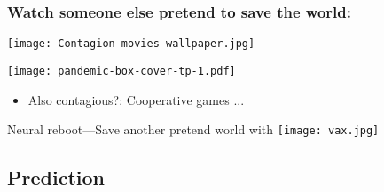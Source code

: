 \begin{frame}

  \frametitle{Watch someone else pretend to save the world:}

  \texttt{[image: Contagion-movies-wallpaper.jpg]}


\end{frame}

\begin{frame}

  \begin{block}{}
    \begin{center}
      \texttt{[image: pandemic-box-cover-tp-1.pdf]}
    \end{center}
    \begin{itemize}
    \item 
      Also contagious?: Cooperative games ...
    \end{itemize}
    
  \end{block}

\end{frame}

\begin{frame}
  Neural reboot---Save another pretend world with 
  \bigskip
  \texttt{[image: vax.jpg]}
\end{frame}

\subsection{Prediction}

